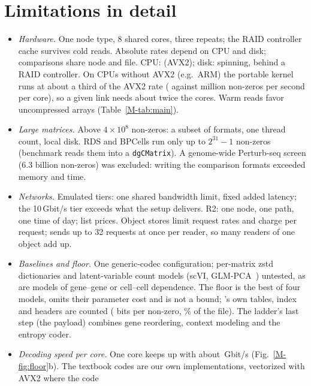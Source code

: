 \section{Limitations in detail}
\label{sec:slimits}

\begin{itemize}\itemsep 1pt
\item \emph{Hardware.} One node type, 8 shared cores, three repeats; the RAID controller cache survives cold reads.
  Absolute rates depend on CPU and disk; comparisons share node and file. CPU:  (AVX2); disk: spinning, behind a
  RAID controller. On CPUs without AVX2 (e.g.\ ARM) the portable kernel runs at about a third of the AVX2 rate
  ( against  million non-zeros per second per core), so a
  given link needs about twice the cores. Warm reads favor uncompressed arrays (Table~\ref{M-tab:main}).
\item \emph{Large matrices.} Above $4\times10^8$ non-zeros: a subset of formats, one thread count, local disk. RDS and
  BPCells run only up to $2^{31}-1$ non-zeros (benchmark reads them into a \texttt{dgCMatrix}). A genome-wide Perturb-seq
  screen (6.3 billion non-zeros) was excluded: writing the comparison formats exceeded memory and time.
\item \emph{Networks.} Emulated tiers: one shared bandwidth limit, fixed added latency; the 10\,Gbit/s tier exceeds what
  the setup delivers. R2: one node, one path, one time of day; list prices. Object stores limit request rates and
  charge per request; \sone{} sends up to 32 requests at once per reader, so many readers of one object add up.
\item \emph{Baselines and floor.} One generic-codec configuration; per-matrix zstd dictionaries and latent-variable count
  models (scVI, GLM-PCA~\cite{lopez2018deep,townes2019feature}) untested, as are models of gene--gene or cell--cell
  dependence. The floor is the best of four models, omits their parameter cost and is not a bound; \sone's own tables,
  index and headers are counted ( bits per non-zero, \% of the file). The ladder's last step (the \sone{} payload) combines gene reordering, context modeling and the entropy coder.
\item \emph{Decoding speed per core.} One core keeps up with about \,Gbit/s
  (Fig.~\ref{M-fig:floor}b). The textbook codes are our own implementations, vectorized with AVX2 where the code

\end{itemize}
